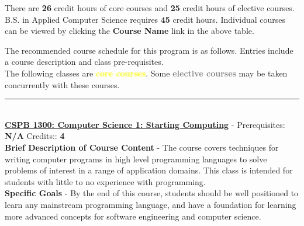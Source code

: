 \documentclass{article}
\newcommand{\horizontalline}{\noindent \rule{\textwidth}{0.5pt} \\}
\begin{document}
\newline \noindent
There are \textbf{26} credit hours of core courses and \textbf{25} credit hours of elective courses. B.S. in Applied Computer Science requires \textbf{45} credit hours. Individual courses can be viewed by clicking the \textbf{Course Name} link in the above table. \newline

\noindent The recommended course schedule for this program is as follows. Entries include a course description and class pre-requisites.  \\

\noindent The following classes are \textcolor{yellow}{\textbf{core courses}}. Some \textcolor{gray}{\textbf{elective courses}} may be taken concurrently with these courses.

\horizontalline
\noindent \href{https://www.colorado.edu/program/cspb/cspb-1300-computer-science-1-starting-computing}{\textbf{CSPB 1300: Computer Science 1: Starting Computing}} - Prerequisites: \textbf{N/A} Credits:: \textbf{4} \\

\noindent \textbf{Brief Description of Course Content} - The course covers techniques for writing computer programs in high level programming languages to solve problems of interest in a range of application domains. This class is intended for students with little to no experience with programming. \\

\noindent \textbf{Specific Goals} - By the end of this course, students should be well positioned to learn any mainstream programming language, and have a foundation for learning more advanced concepts for software engineering and computer science. \\
\end{document}
